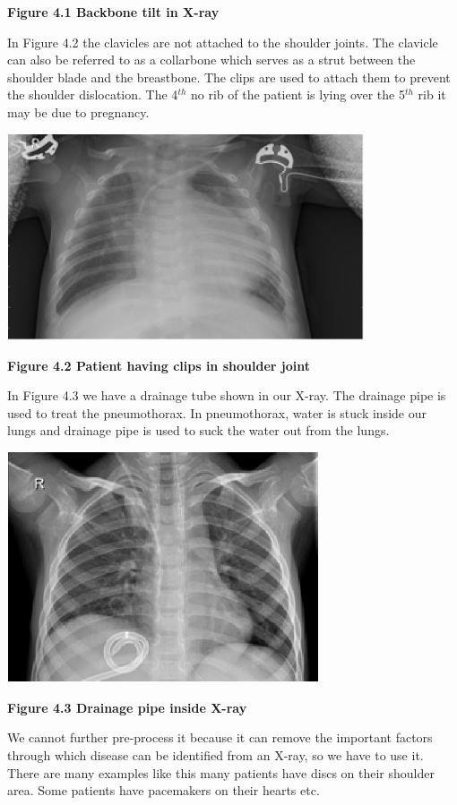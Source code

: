 \documentclass{article} %
\begin{document}
\noindent \textbf{Figure 4.1 Backbone tilt in X-ray}

\noindent In Figure 4.2 the clavicles are not attached to the shoulder joints. The clavicle can also be referred to as a collarbone which serves as a strut between the shoulder blade and the breastbone.  The clips are used to attach them to prevent the shoulder dislocation. The 4${}^{th}$ no rib of the patient is lying over the 5${}^{th}$ rib it may be due to pregnancy.   

\noindent \includegraphics*[width=4.16in, height=2.40in, keepaspectratio=false]{image16}

\noindent \textbf{Figure 4.2 Patient having clips in shoulder joint}

\noindent In Figure 4.3 we have a drainage tube shown in our X-ray. The drainage pipe is used to treat the pneumothorax. In pneumothorax, water is stuck inside our lungs and drainage pipe is used to suck the water out from the lungs. 

\noindent \includegraphics*[width=3.63in, height=2.68in, keepaspectratio=false]{image17}

\noindent \textbf{Figure 4.3 Drainage pipe inside X-ray}

\noindent We cannot further pre-process it because it can remove the important factors through which disease can be identified from an X-ray, so we have to use it. There are many examples like this many patients have discs on their shoulder area. Some patients have pacemakers on their hearts etc. 
\end{document}
